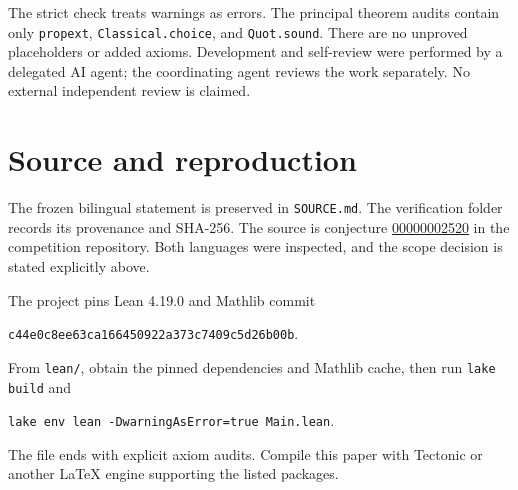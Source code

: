 \documentclass[11pt]{article}
\begin{document}
The strict check treats warnings as errors. The principal theorem
audits contain only \texttt{propext}, \texttt{Classical.choice}, and
\texttt{Quot.sound}. There are no unproved placeholders or added axioms.
Development and self-review were performed by a delegated AI agent;
the coordinating agent reviews the work separately. No external
independent review is claimed.

\section{Source and reproduction}
The frozen bilingual statement is preserved in \texttt{SOURCE.md}.
The verification folder records its provenance and SHA-256.
The source is conjecture
\href{https://github.com/The-Last-Math-Competition/The-Last-Math-Competition/blob/main/conjectures/00000002520.md}{00000002520}
in the competition repository. Both languages were inspected, and the
scope decision is stated explicitly above.

The project pins Lean 4.19.0 and Mathlib commit
\begin{center}
\texttt{c44e0c8ee63ca166450922a373c7409c5d26b00b}.
\end{center}
From \texttt{lean/}, obtain the pinned dependencies and Mathlib cache,
then run \texttt{lake build} and
\begin{center}
\texttt{lake env lean -DwarningAsError=true Main.lean}.
\end{center}
The file ends with explicit axiom audits. Compile this paper with
Tectonic or another LaTeX engine supporting the listed packages.
\end{document}
